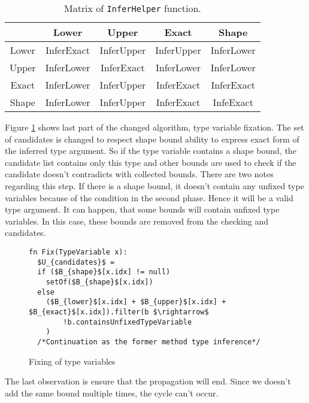\begin{table}[h!]
\begin{center}
\begin{tabular}{ | c | c | c | c | c | } 
  \hline
   & Lower & Upper & Exact & Shape\\
  \hline
  Lower & InferExact  &  InferUpper & InferUpper & InferLower \\
  \hline
  Upper & InferLower  &  InferExact & InferLower & InferLower \\
  \hline
  Exact & InferLower  &  InferUpper & InferExact & InferExact \\
  \hline
  Shape & InferLower  &  InferUpper & InferExact & InfeExact \\
  \hline
\end{tabular}
\end{center}
\caption{Matrix of \texttt{InferHelper} function.}
\label{table3:InferHelper}
\end{table}
\par
Figure \ref{img55::mainTypeInference3} shows last part of the changed algorithm, type variable fixation.
The set of candidates is changed to respect shape bound ability to express exact form of the inferred type argument.
So if the type variable contains a shape bound, the candidate list contains only this type and other bounds are used to check if the candidate doesn't contradicts with collected bounds.
There are two notes regarding this step.
If there is a shape bound, it doesn't contain any unfixed type variables because of the condition in the second phase.
Hence it will be a valid type argument.
It can happen, that some bounds will contain unfixed type variables.
In this case, these bounds are removed from the checking and candidates.
\begin{figure}[h!]
\begin{lstlisting}[style=myAlgo, mathescape=true]
fn Fix(TypeVariable x):
  $U_{candidates}$ = 
  if ($B_{shape}$[x.idx] != null)
    setOf($B_{shape}$[x.idx])
  else
    ($B_{lower}$[x.idx] + $B_{upper}$[x.idx] + $B_{exact}$[x.idx]).filter(b $\rightarrow$
        !b.containsUnfixedTypeVariable
    )
  /*Continuation as the former method type inference*/
\end{lstlisting}
\caption{Fixing of type variables}
\label{img55::mainTypeInference3}
\end{figure}
\par
The last observation is ensure that the propagation will end.
Since we doesn't add the same bound multiple times, the cycle can't occur.

